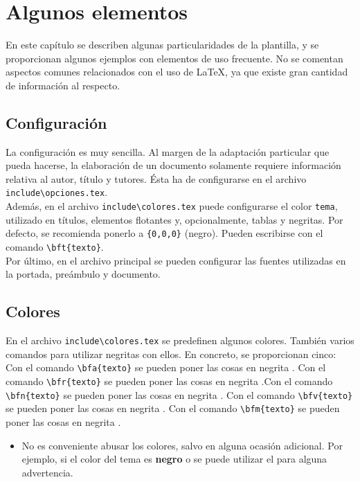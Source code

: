 \chapter{Algunos elementos}

En este capítulo se describen algunas particularidades de la plantilla, y se proporcionan algunos ejemplos con elementos de uso frecuente. No se comentan aspectos comunes relacionados con el uso de \LaTeX, ya que existe gran cantidad de información al respecto.

\section{Configuración}
La configuración es muy sencilla. Al margen de la adaptación particular que pueda hacerse, la elaboración de un documento solamente requiere información relativa al autor, título y tutores. Ésta ha de configurarse en el archivo \verb+include\opciones.tex+.  \\

Además, en el archivo \verb+include\colores.tex+ puede configurarse el color \verb+tema+, utilizado en títulos, elementos flotantes y, opcionalmente, tablas y negritas. Por defecto, se recomienda ponerlo a \verb+{0,0,0}+  (negro). Pueden escribirse  con el comando \verb+\bft{texto}+. \\

Por último, en el archivo principal se pueden configurar las fuentes utilizadas en la portada, preámbulo y documento.

\section{Colores}


En el archivo \verb+include\colores.tex+ se predefinen algunos colores. También varios comandos para utilizar negritas con ellos. En concreto, se proporcionan cinco: Con el comando \verb+\bfa{texto}+ se pueden poner las cosas en negrita . Con el comando \verb+\bfr{texto}+ se pueden poner las cosas en negrita .Con el comando \verb+\bfn{texto}+ se pueden poner las cosas en negrita . Con el comando \verb+\bfv{texto}+ se pueden poner las cosas en negrita . Con el comando \verb+\bfm{texto}+ se pueden poner las cosas en negrita .\\

\begin{itemize}
\item [\hmarkr] No es conveniente abusar los colores, salvo en alguna ocasión adicional. Por ejemplo, si el color del tema es {\bf negro} o  se puede utilizar el  para alguna advertencia.
\end{itemize}

